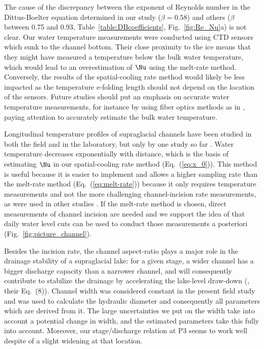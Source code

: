 The cause of the discrepancy between the exponent of Reynolds number in the Dittus-Boelter equation determined in our study ($\beta=0.58$) and others ($\beta$ between 0.75 and 0.93, Table~\ref{table:DBcoefficients}, Fig.~\ref{fig:Re_Nu}a) is not clear. Our water temperature measurements were conducted using CTD sensors which sunk to the channel bottom. Their close proximity to the ice means that they might have measured a temperature below the bulk water temperature, which would lead to an overestimation of $\Nu$ using the melt-rate method. Conversely, the results of the spatial-cooling rate method would likely be less impacted as the temperature e-folding length should not depend on the location of the sensors.
Future studies should put an emphasis on accurate water temperature measurements, for instance by using fiber optics methods as in \citet{Karlstrom&al2014}, paying attention to accurately estimate the bulk water temperature.

Longitudinal temperature profiles of supraglacial channels have been studied in both the field and in the laboratory, but only by one study so far \citep{Isenko&al2005}. Water temperature decreases exponentially with distance, which is the basis of estimating $\Nu$ in our spatial-cooling rate method (Eq.~(\ref{eq:x_0})). This method is useful because it is easier to implement and allows a higher sampling rate than the melt-rate method (Eq.~(\ref{eq:melt-rate})) because it only requires temperature measurements and not the more challenging channel-incision rate measurements, as were used in other studies \citep[e.g.][]{Vincent&al2010}.
If the melt-rate method is chosen, direct measurements of channel incision are needed and
we support the idea of \cite{Raymond&Nolan2000} that daily water level cuts can be used to conduct those measurements a posteriori (Fig.~\ref{fig:picture_channel}).

Besides the incision rate, the channel aspect-ratio plays a major role in the drainage stability of a supraglacial lake: for a given stage, a wider channel has a bigger discharge capacity than a narrower channel, and will consequently contribute to stabilize the drainage by accelerating the lake-level draw-down (\cite{Raymond&Nolan2000}, their Eq.~(8)). Channel width was considered constant in the present field study and was used to calculate the hydraulic diameter and consequently all parameters which are derived from it. The large uncertainties we put on the width take into account a potential change in width, and  the estimated parameters take this fully into account. Moreover, our stage/discharge relation at P3 seems to work well despite of a slight widening at that location.

